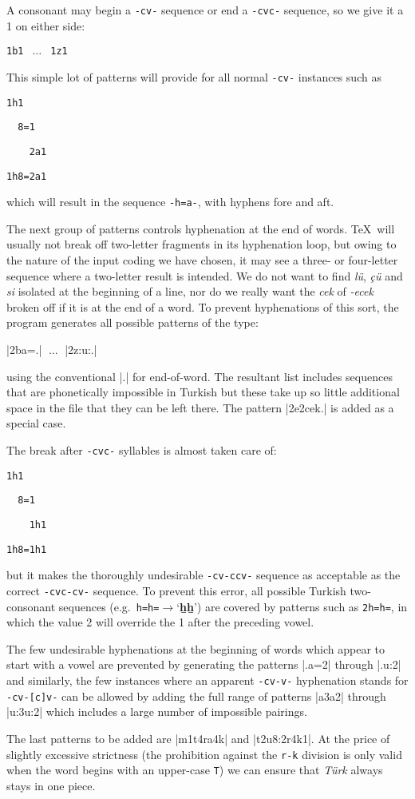 A consonant may begin a {\tt -cv-} sequence or end a {\tt -cvc-} sequence,
so we give it a 1 on either side:
\smallskip
\centerline{\tt 1b1 $\;\ldots\;$ 1z1}
\smallskip

This simple lot of patterns will provide for all normal {\tt -cv-}
instances such as
\smallskip
\centerline{\tt1h1\ \ \ \ } %
\centerline{\tt\ \ 8=1\ \ }
\centerline{\tt\ \ \ \ 2a1}
\centerline{\tt1h8=2a1}
\smallskip
\noindent which will result in the sequence {\tt-h=a-}, with hyphens fore
and aft.

The next group of patterns controls hyphenation at the end
of words.  \TeX\ will usually not break off two-letter fragments
in its hyphenation loop, but owing to the nature of the input coding
we have chosen, it may see a three- or four-letter sequence where
a two-letter result is intended.  We do not want to find
{\it l\"u}, {\it\c c\"u\/} and {\it si\/} isolated at the beginning
of a line, nor do we really want the {\it cek\/} of {\it -ecek\/}
broken off if it is at the end of a word. To prevent hyphenations of
this sort, the program generates all possible patterns of the type:
\smallskip
\centerline{|2ba=.| $\;\ldots\;$ |2z:u:.|}
\smallskip
\noindent using the conventional |.| for end-of-word.
The resultant list includes sequences that are phonetically impossible in 
Turkish but these take up so little additional space in the file that
they can be left there.  The pattern |2e2cek.|\kern -1.5pt is added as a special case.

The break after {\tt -cvc-} syllables is almost taken care of:
\smallskip
\centerline{\tt1h1\ \ \ \ } %
\centerline{\tt\ \ 8=1\ \ }
\centerline{\tt\ \ \ \ 1h1}
\centerline{\tt1h8=1h1}
\smallskip
\noindent but it makes the thoroughly undesirable {\tt -cv-ccv-}
sequence as acceptable as the correct {\tt -cvc-cv-} sequence.
To prevent this error, all possible Turkish
two-consonant sequences (e.g.\ {\tt h=h=}${}\rightarrow{}$`{\bf\b h\b h}')
are covered by patterns such as {\tt2h=h=}, in which the value 2
will override the 1 after the preceding vowel.  

The few undesirable hyphenations at the beginning of
words which appear to start with a vowel are prevented
by generating the patterns
|.a=2| through |.u:2| and
similarly, the few instances where an apparent {\tt -cv-v-} hyphenation
stands for {\tt -cv-[c]v-} can be allowed by adding the full range of patterns
|a3a2| through |u:3u:2| which includes a large number of impossible
pairings.


The last patterns to be added are |m1t4ra4k| and |t2u8:2r4k1|.  At the price of
slightly excessive strictness (the prohibition against the {\tt r-k}
division is only valid when the word begins with an upper-case {\tt T})
we can ensure that {\it T\"urk\/} always stays in one piece.

